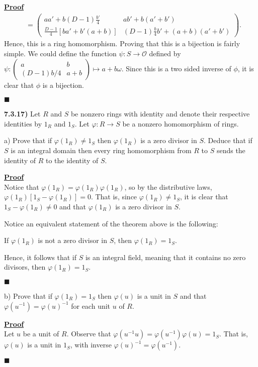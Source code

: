 \documentclass[12pt,a4paper]{article}
\newcommand{\prob}[2]{\textbf{#1)} #2}
\newenvironment{proof}
{
\textbf{\underline{Proof}} \\
}
{
\begin{flushright}
$\blacksquare$
\end{flushright}}
\begin{document}
\begin{proof}
\begin{align*}
		&=
		\begin{pmatrix}
			aa' + b(D-1)\frac{b'}{4} & ab' + b(a' + b') \\
			\frac{D-1}{4}[ba' + b'(a + b)] & (D-1)\frac{b}{4}b' + (a+b)(a'+b')
		\end{pmatrix}
	.\end{align*}
	Hence, this is a ring homomorphism.
	Proving that this is a bijection is fairly simple.
	We could define the function $\psi: S \to \mathcal{O}$ defined by $\psi: \begin{pmatrix}
	a & b \\
	(D-1)b/4 & a+b
	\end{pmatrix}
	\mapsto
	a + b\omega$.
	Since this is a two sided inverse of $\phi$, it is clear that $\phi$ is a bijection.
\end{proof}

\prob{7.3.17}{
Let $R$ and $S$ be nonzero rings with identity and denote their respective identities by $1_{R}$ and $1_{S}$. Let $\varphi: R \rightarrow S$ be a nonzero homomorphism of rings.
}

a) Prove that if $\varphi(1_{R}) \ne 1_{S}$ then $\varphi(1_{R})$ is a zero divisor in $S$. Deduce that if $S$ is an integral domain then every ring homomorphism from $R$ to $S$ sends the identity of $R$ to the identity of $S$.

\begin{proof}
	Notice that $\varphi(1_R) = \varphi(1_R)\varphi(1_R)$, so by the distributive laws, $\varphi(1_R)[1_S - \varphi(1_R)] = 0$. 
	That is, since $\varphi(1_R) \ne 1_S$, it is clear that $1_S - \varphi(1_R) \ne 0$ and that $\varphi(1_R)$ is a zero divisor in $S$.
	
	Notice an equivalent statement of the theorem above is the following:
	\begin{center}
		If $\varphi(1_R)$ is not a zero divisor in $S$, then $\varphi(1_R) = 1_S$.
	\end{center}
	Hence, it follows that if $S$ is an integral field, meaning that it contains no zero divisors, then $\varphi(1_R) = 1_S$.
\end{proof}

b) Prove that if $\varphi(1_{R}) = 1_{S}$ then $\varphi(u)$ is a unit in $S$ and that $\varphi\left( u^{-1} \right) = \varphi\left( u \right)^{-1}$ for each unit $u$ of $R$.

\begin{proof}
	Let $u$ be a unit of $R$.
	Observe that $\varphi(u^{-1}u) = \varphi(u^{-1})\varphi(u) = 1_S$.
	That is, $\varphi(u)$ is a unit in $1_S$, with inverse $\varphi(u)^{-1} = \varphi(u^{-1})$.
\end{proof}
\end{document}
